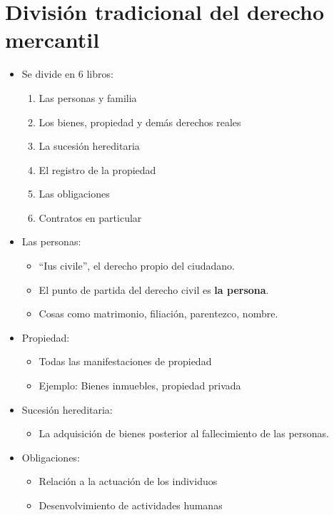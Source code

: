\documentclass{article}
\begin{document}
\section{División tradicional del derecho mercantil}
\begin{itemize}
    \item Se divide en 6 libros:
        \begin{enumerate}
            \item Las personas y familia 
            \item Los bienes, propiedad y demás derechos reales 
            \item La sucesión hereditaria 
            \item El registro de la propiedad 
            \item Las obligaciones 
            \item Contratos en particular
        \end{enumerate}
    
    \item Las personas: 
        \begin{itemize}
            \item ``Ius civile'', el derecho propio del ciudadano.
            \item El punto de partida del derecho civil es \textbf{la persona}.
            \item Cosas como matrimonio, filiación, parentezco, nombre.
        \end{itemize}
    
    \item Propiedad: 
        \begin{itemize}
            \item Todas las manifestaciones de propiedad 
            \item Ejemplo: Bienes inmuebles, propiedad privada
        \end{itemize}
    
    \item Sucesión hereditaria:
        \begin{itemize}
            \item La adquisición de bienes posterior al fallecimiento de las personas.
        \end{itemize}
    
    \item Obligaciones: 
        \begin{itemize}
            \item Relación a la actuación de los individuos
            \item Desenvolvimiento de actividades humanas
        \end{itemize}
\end{itemize}
\end{document}
